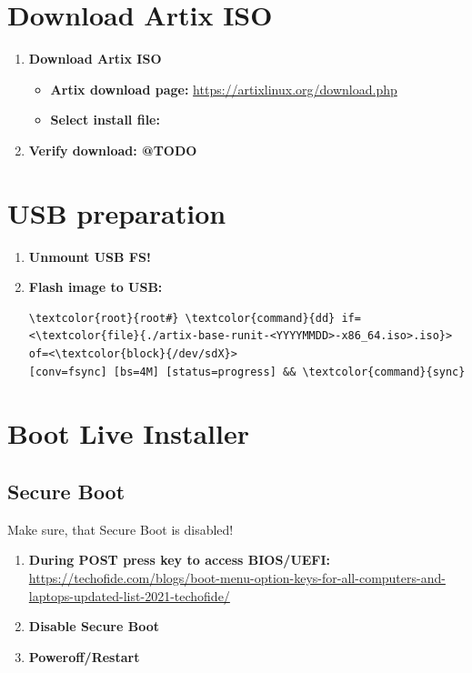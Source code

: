 \documentclass[10pt, a4paper, onecolumn, oneside, titlepage, openany]{book}
\begin{document}
\section{Download Artix ISO}
\begin{enumerate}
    \item \textbf{Download Artix ISO}
    \begin{itemize}
        \item \textbf{Artix download page:}
\newline \url{https://artixlinux.org/download.php}
        \item \textbf{Select install file:}
\newline {}
    \end{itemize}
    \item \textbf{Verify download: @TODO}
\end{enumerate}

\section{USB preparation}
\begin{enumerate}
    \item \textbf{Unmount USB FS!}
    \item \textbf{Flash image to USB:}
\begin{Verbatim}[commandchars=\\\{\}]
\textcolor{root}{root#} \textcolor{command}{dd} if=<\textcolor{file}{./artix-base-runit-<YYYYMMDD>-x86_64.iso>.iso}> of=<\textcolor{block}{/dev/sdX}>
[conv=fsync] [bs=4M] [status=progress] && \textcolor{command}{sync}
\end{Verbatim}
\end{enumerate}

\section{Boot Live Installer}
\subsection{Secure Boot}
Make sure, that Secure Boot is disabled!
\begin{enumerate}
    \item \textbf{During POST press key to access BIOS/UEFI:}
\newline \href{https://techofide.com/blogs/boot-menu-option-keys-for-all-computers-and-laptops-updated-list-2021-techofide/}{https://techofide.com/blogs/boot-menu-option-keys-for-all-computers-and-laptops-updated-list-2021-techofide/}
    \item \textbf{Disable Secure Boot}
    \item \textbf{Poweroff/Restart}
\end{enumerate}
\end{document}
